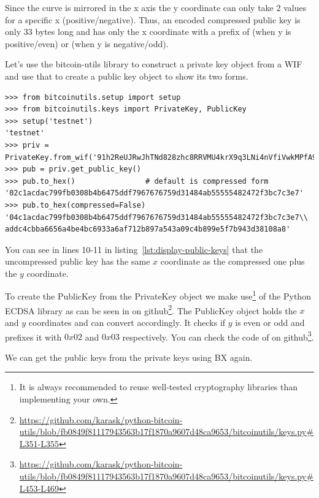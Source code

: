 Since the curve is mirrored in the x axis the y coordinate can only take 2 values for a specific x (positive/negative). Thus, an encoded compressed public key is only 33 bytes long and has only the x coordinate with a prefix of  (when y is positive/even) or  (when y is negative/odd).

Let's use the bitcoin-utils library to construct a private key object from a WIF and use that to create a public key object to show its two forms.

\vspace{1em}
\begin{lstlisting}[style=Python,label={lst:display-public-keys},caption={Python example to generate compressed and uncompressed public keys},captionpos=b]
>>> from bitcoinutils.setup import setup
>>> from bitcoinutils.keys import PrivateKey, PublicKey
>>> setup('testnet')
'testnet'
>>> priv = PrivateKey.from_wif('91h2ReUJRwJhTNd828zhc8RRVMU4krX9q3LNi4nVfiVwkMPfA9p')
>>> pub = priv.get_public_key()
>>> pub.to_hex()                # default is compressed form
'02c1acdac799fb0308b4b6475ddf7967676759d31484ab55555482472f3bc7c3e7'
>>> pub.to_hex(compressed=False)
'04c1acdac799fb0308b4b6475ddf7967676759d31484ab55555482472f3bc7c3e7\\
addc4cbba6656a4be4bc6933a6af712b897a543a09c4b899e5f7b943d38108a8'
\end{lstlisting}
\vspace{1em}

You can see in lines 10-11 in listing~\ref{lst:display-public-keys} that the uncompressed public key has the same $x$ coordinate as the compressed one plus the $y$ coordinate.

To create the PublicKey from the PrivateKey object we make use\footnote{It is always recommended to reuse well-tested cryptography libraries than implementing your own.} of the Python ECDSA library as can be seen in  on github\footnote{\url{https://github.com/karask/python-bitcoin-utils/blob/fb0849f81117943563b17f1870a9607d48ca9653/bitcoinutils/keys.py\#L351-L355}}. The PublicKey object holds the $x$ and $y$ coordinates and can convert accordingly. It checks if $y$ is even or odd and prefixes it with $0x02$ and $0x03$ respectively. You can check the code of  on github\footnote{\url{https://github.com/karask/python-bitcoin-utils/blob/fb0849f81117943563b17f1870a9607d48ca9653/bitcoinutils/keys.py\#L453-L469}}.

We can get the public keys from the private keys using BX again.

